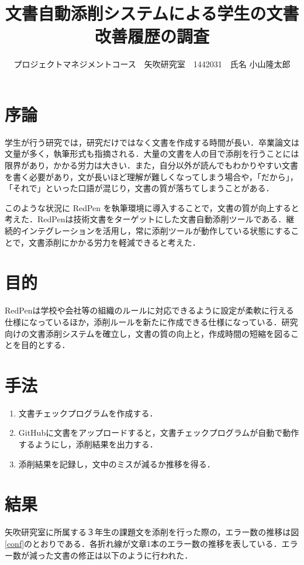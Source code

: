 \documentclass[uplatex,twocolumn,dvipdfmx]{jsarticle}
\title{\vspace{-5mm}\fontsize{14pt}{0pt}\selectfont 文書自動添削システムによる学生の文書改善履歴の調査}
\author{\normalsize プロジェクトマネジメントコース　矢吹研究室　1442031　氏名 小山隆太郎}
\date{}
\begin{document}
\fontsize{10.5pt}{\baselineskip}\selectfont
\maketitle





\section{序論}
学生が行う研究では，研究だけではなく文書を作成する時間が長い．卒業論文は文量が多く，執筆形式も指摘される．大量の文書を人の目で添削を行うことには限界があり，かかる労力は大きい．また，自分以外が読んでもわかりやすい文書を書く必要があり，文が長いほど理解が難しくなってしまう場合や，「だから」，「それで」といった口語が混じり，文書の質が落ちてしまうことがある．

このような状況に RedPen\cite{a} を執筆環境に導入することで，文書の質が向上すると考えた．RedPenは技術文書をターゲットにした文書自動添削ツールである．継続的インテグレーションを活用し，常に添削ツールが動作している状態にすることで，文書添削にかかる労力を軽減できると考えた．

\section{目的}
RedPenは学校や会社等の組織のルールに対応できるように設定が柔軟に行える仕様になっているほか，添削ルールを新たに作成できる仕様になっている．研究向けの文書添削システムを確立し，文書の質の向上と，作成時間の短縮を図ることを目的とする．

\section{手法}
\begin{enumerate}
\item 文書チェックプログラムを作成する．
\item GitHubに文書をアップロードすると，文書チェックプログラムが自動で動作するようにし，添削結果を出力する． 
\item 添削結果を記録し，文中のミスが減るか推移を得る．
\end{enumerate}

\section{結果}
矢吹研究室に所属する３年生の課題文を添削を行った際の，エラー数の推移は図\ref{conf}のとおりである．各折れ線が文章1本のエラー数の推移を表している．エラー数が減った文書の修正は以下のように行われた．
\end{document}
